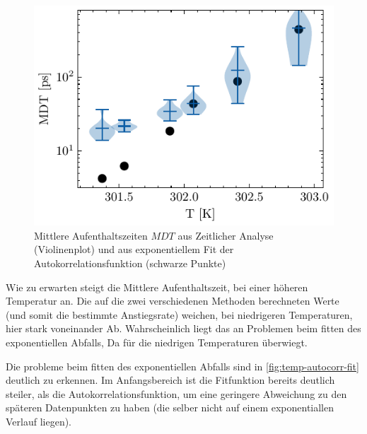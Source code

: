 \documentclass[main.tex]{subfiles}
\begin{document}
\begin{figure}[H]
    \centering
    \includegraphics{bilder/plots/temp_comparison/mean_dwell_time_comparison.pdf}
    \caption{Mittlere Aufenthaltszeiten $MDT$ aus Zeitlicher Analyse (Violinenplot) und aus exponentiellem Fit der Autokorrelationsfunktion (schwarze Punkte)}\label{fig:temp-mdt-comp}
\end{figure}

Wie zu erwarten steigt die Mittlere Aufenthaltszeit, bei einer höheren Temperatur an. Die auf die zwei verschiedenen Methoden berechneten Werte (und somit die bestimmte Anstiegsrate) weichen, bei niedrigeren Temperaturen, hier stark voneinander Ab. 
Wahrscheinlich liegt das an Problemen beim fitten des exponentiellen Abfalls, Da für die niedrigen Temperaturen  überwiegt.


Die probleme beim fitten des exponentiellen Abfalls sind in \cref{fig:temp-autocorr-fit} deutlich zu erkennen. Im Anfangsbereich ist die Fitfunktion bereits deutlich steiler, als die Autokorrelationsfunktion, um eine geringere Abweichung zu den späteren Datenpunkten zu haben (die selber nicht auf einem exponentiallen Verlauf liegen).

\end{document}
